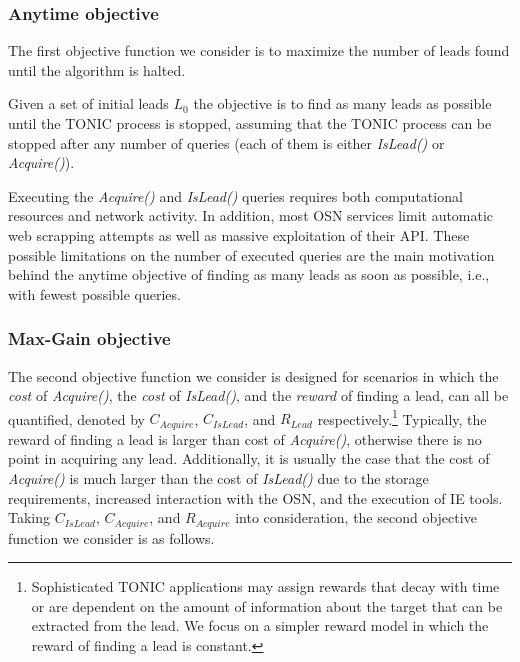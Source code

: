 \documentclass[prodmode,acmtecs]{acmsmall} %
\newcommand{\note}[2]{\textbf{\textsc{#1} says: \textit{#2}}}
\newcommand{\islead}[1]{{\em IsLead(#1)}}
\newcommand{\acquire}[1]{{\em Acquire(#1)}}
\begin{document}


\subsubsection{Anytime objective}

The first objective function we consider is to maximize the number of leads found until the algorithm is halted. 



\begin{definition}
Given a set of initial leads \(L_0\) the objective is to find as many leads as possible until the TONIC process is stopped, assuming that the TONIC process can be stopped after any number of queries (each of them is either \islead{} or \acquire{}).
\label{def:budget}
\end{definition}

Executing the \acquire{} and \islead{} queries requires both computational resources and network activity. 
In addition, most OSN services limit automatic web scrapping attempts as well as massive exploitation of their API. 
These possible limitations on the number of executed queries are the main motivation behind the anytime objective of finding as many leads as soon as possible, i.e., with fewest possible queries.  

\subsubsection{Max-Gain objective}

The second objective function we consider is designed for scenarios in which 
the {\em cost} of \acquire{}, the {\em cost} of \islead{}, and the {\em reward} of finding a lead, can all be quantified, denoted by $C_{Acquire}$, $C_{IsLead}$, and $R_{Lead}$ respectively.\footnote{Sophisticated TONIC applications may assign rewards that decay with time or are dependent on the amount of information about the target that can be extracted from the lead. We focus on a simpler reward model in which the reward of finding a lead is constant.} 
Typically, the reward of finding a lead is larger than cost of \acquire{}, otherwise there is no point in acquiring any lead. Additionally, it is usually the case that the cost of \acquire{} is much larger than the cost of \islead{} due to the storage requirements, increased interaction with the OSN, and the execution of IE tools. Taking $C_{IsLead}$, $C_{Acquire}$, and $R_{Acquire}$ into consideration, the second objective function we consider is as follows.
\end{document}
